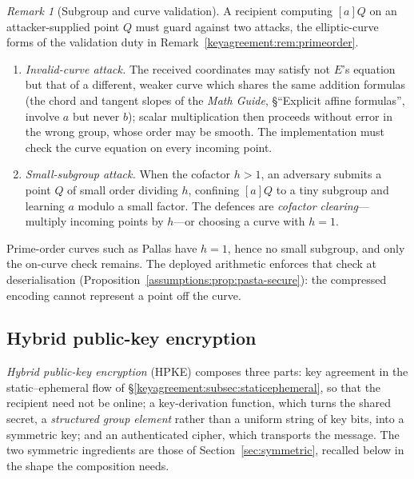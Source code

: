 \documentclass[11pt,a4paper]{article}
\theoremstyle{definition}
\theoremstyle{remark}
\newtheorem{remark}[theorem]{Remark}
\begin{document}
\begin{remark}[Subgroup and curve validation]
\label{keyagreement:rem:ec-validation}
A recipient computing \([a]Q\) on an attacker-supplied point \(Q\)
must guard against two attacks, the elliptic-curve forms of the
validation duty in Remark~\ref{keyagreement:rem:primeorder}.
\begin{enumerate}
\item \emph{Invalid-curve attack.} The received coordinates may
  satisfy not \(E\)'s equation but that of a different, weaker curve
  which shares the same addition formulas (the chord and tangent
  slopes of the \emph{Math Guide}, \S``Explicit affine formulas'',
  involve \(a\) but never \(b\)); scalar multiplication then proceeds
  without error in the wrong group, whose order may be smooth. The
  implementation must check the curve equation on every incoming point.
\item \emph{Small-subgroup attack.} When the cofactor \(h > 1\), an
  adversary submits a point \(Q\) of small order dividing \(h\),
  confining \([a]Q\) to a tiny subgroup and learning \(a\) modulo a
  small factor. The defences are \emph{cofactor clearing}---multiply
  incoming points by \(h\)---or choosing a curve with \(h = 1\).
\end{enumerate}
Prime-order curves such as Pallas have \(h = 1\), hence no small
subgroup, and only the on-curve check remains. The deployed arithmetic
enforces that check at deserialisation
(Proposition~\ref{assumptions:prop:pasta-secure}): the compressed
encoding cannot represent a point off the curve.
\end{remark}

\subsection{Hybrid public-key encryption}
\label{keyagreement:subsec:hpke}

\emph{Hybrid public-key encryption} (HPKE) composes three parts: key
agreement in the static--ephemeral flow of
\S\ref{keyagreement:subsec:staticephemeral}, so that the recipient
need not be online; a key-derivation function, which turns the shared
secret, a \emph{structured group element} rather than a uniform string
of key bits, into a symmetric key; and an authenticated cipher, which
transports the message. The two symmetric ingredients are those of
Section~\ref{sec:symmetric}, recalled below in the shape the
composition needs.
\end{document}
